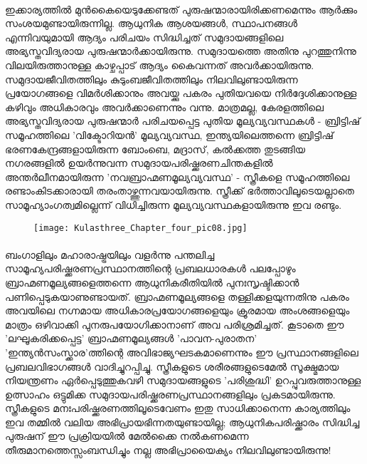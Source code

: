 \paragraph{}ഇക്കാര്യത്തിൽ മുൻകൈയെടുക്കേണ്ടത് പുരുഷന്മാരായിരിക്കണമെന്നും ആർക്കും സംശയമുണ്ടായിരുന്നില്ല. ആധുനിക ആശയങ്ങൾ, സ്ഥാപനങ്ങൾ എന്നിവയുമായി ആദ്യം പരിചയം സിദ്ധിച്ചത് സമുദായങ്ങളിലെ അഭ്യസ്തവിദ്യരായ പുരുഷന്മാർക്കായിരുന്നു. സമുദായത്തെ അതിനു പുറത്തുനിന്നു വിലയിരുത്താനുള്ള കാഴ്ചപ്പാട് ആദ്യം കൈവന്നത് അവർക്കായിരുന്നു. സമുദായജീവിതത്തിലും കുടുംബജീവിതത്തിലും നിലവിലുണ്ടായിരുന്ന പ്രയോഗങ്ങളെ വിമർശിക്കാനും അവയ്ക്കു പകരം പുതിയവയെ നിർദ്ദേശിക്കാനുള്ള കഴിവും അധികാരവും അവർക്കാണെന്നും വന്നു. മാത്രമല്ല, കേരളത്തിലെ അഭ്യസ്തവിദ്യരായ പുരുഷന്മാർ പരിചയപ്പെട്ട പുതിയ മൂല്യവ്യവസ്ഥകൾ - ബ്രിട്ടിഷ് സമൂഹത്തിലെ 'വിക്ടോറിയൻ' മൂല്യവ്യവസ്ഥ, ഇന്ത്യയിലെത്തന്നെ ബ്രിട്ടിഷ് ഭരണകേന്ദ്രങ്ങളായിരുന്ന ബോംബെ, മദ്രാസ്, കൽക്കത്ത തുടങ്ങിയ നഗരങ്ങളിൽ ഉയർന്നുവന്ന സമുദായപരിഷ്ക്കരണചിന്തകളിൽ അന്തർലീനമായിരുന്ന 'നവബ്രാഹ്മണമൂല്യവ്യവസ്ഥ' - സ്ത്രീകളെ സമൂഹത്തിലെ രണ്ടാംകിടക്കാരായി തരംതാഴ്ത്തുന്നവയായിരുന്നു. സ്ത്രീക്ക് ഭർത്താവിലൂടെയല്ലാതെ സാമൂഹ്യാംഗത്വമില്ലെന്ന് വിധിച്ചിരുന്ന മൂല്യവ്യവസ്ഥകളായിരുന്നു ഇവ രണ്ടും.

\begin{figure}[h]
\begin{center}
\texttt{[image: Kulasthree\_Chapter\_four\_pic08.jpg]}
\end{center}
\end{figure}

\paragraph{}ബംഗാളിലും മഹാരാഷ്ട്രയിലും വളർന്നു പന്തലിച്ച സാമൂഹ്യപരിഷ്ക്കരണപ്രസ്ഥാനത്തിന്റെ പ്രബലധാരകൾ പലപ്പോഴും ബ്രാഹ്മണമൂല്യങ്ങളെത്തന്നെ ആധുനികരീതിയിൽ പുനഃസൃഷ്ടിക്കാൻ പണിപ്പെടുകയാണുണ്ടായത്. ബ്രാഹ്മണമൂല്യങ്ങളെ തള്ളിക്കളയുന്നതിനു പകരം അവയിലെ നഗ്നമായ അധികാരപ്രയോഗങ്ങളെയും ക്രൂരമായ അംശങ്ങളെയും മാത്രം ഒഴിവാക്കി പുനരുപയോഗിക്കാനാണ് അവ പരിശ്രമിച്ചത്. കൂടാതെ ഈ 'ലഘൂകരിക്കപ്പെട്ട' ബ്രാഹ്മണമൂല്യങ്ങൾ 'പാവന-പുരാതന' 'ഇന്ത്യൻസംസ്ക്കാര'ത്തിന്റെ അവിഭാജ്യഘടകമാണെന്നും ഈ പ്രസ്ഥാനങ്ങളിലെ പ്രബലവിഭാഗങ്ങൾ വാദിച്ചുറപ്പിച്ചു. സ്ത്രീകളുടെ ശരീരങ്ങളുടെമേൽ സൂക്ഷ്മമായ നിയന്ത്രണം ഏർപ്പെടുത്തുകവഴി സമുദായങ്ങളുടെ 'പരിശുദ്ധി' ഉറപ്പുവരുത്താനുള്ള ഉത്സാഹം ഒട്ടുമിക്ക സമുദായപരിഷ്ക്കരണപ്രസ്ഥാനങ്ങളിലും പ്രകടമായിരുന്നു. സ്ത്രീകളുടെ മനഃപരിഷ്ക്കരണത്തിലൂടെവേണം ഇതു സാധിക്കാനെന്ന കാര്യത്തിലും ഇവ തമ്മിൽ വലിയ അഭിപ്രായഭിന്നതയുണ്ടായില്ല; ആധുനികപരിഷ്ക്കാരം സിദ്ധിച്ച പുരുഷന് ഈ പ്രക്രിയയിൽ മേൽക്കൈ നൽകണമെന്ന തീരുമാനത്തെസ്സംബന്ധിച്ചും നല്ല അഭിപ്രായൈക്യം നിലവിലുണ്ടായിരുന്നു!

